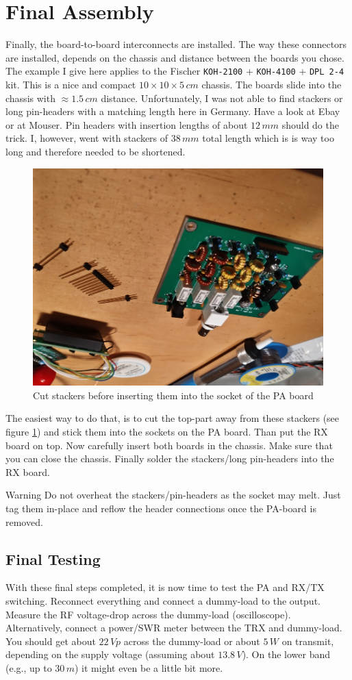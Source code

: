 \documentclass[10pt, a4paper,twoside]{scrartcl}
\newenvironment{warning}{\begin{bclogo}[couleur=red!30,arrondi=.1,logo=\bcattention,ombre=true]{Warning}}{\end{bclogo}}
\begin{document}
\cleardoublepage
\section{Final Assembly} \label{sec:box}
Finally, the board-to-board interconnects are installed. The way these connectors are installed, depends on the chassis and distance between the boards you chose. The example I give here applies to the Fischer \texttt{KOH-2100} + \texttt{KOH-4100} + \texttt{DPL 2-4} kit. This is a nice and compact $10 \times 10 \times 5\,cm$ chassis. The boards slide into the chassis with $\approx 1.5\,cm$ distance. Unfortunately, I was not able to find stackers or long pin-headers with a matching length here in Germany. Have a look at Ebay or at Mouser. Pin headers with insertion lengths of about $12\,mm$ should do the trick. I, however, went with stackers of $38\,mm$ total length which is is way too long and therefore needed to be shortened.

\begin{figure}[!ht]
 \centering
 \includegraphics[width=0.3\linewidth]{fig/stackers_small.png}
 \caption{Cut stackers before inserting them into the socket of the PA board} \label{fig:stackers}
\end{figure}

The easiest way to do that, is to cut the top-part away from these stackers (see figure \ref{fig:stackers}) and stick them into the sockets on the PA board. Than put the RX board on top. Now carefully insert both boards in the chassis. Make sure that you can close the chassis. Finally solder the stackers/long pin-headers into the RX board. 

\begin{warning}
Do not overheat the stackers/pin-headers as the socket may melt. Just tag them in-place and reflow the header connections once the PA-board is removed.
\end{warning}


\subsection{Final Testing}
With these final steps completed, it is now time to test the PA and RX/TX switching. Reconnect everything and connect a dummy-load to the output. Measure the RF voltage-drop across the dummy-load (oscilloscope). Alternatively, connect a power/SWR meter between the TRX and dummy-load. You should get about $22\,Vp$ across the dummy-load or about $5\,W$ on transmit, depending on the supply voltage (assuming about $13.8\,V$). On the lower band (e.g., up to $30\,m$) it might even be a little bit more. 
\end{document}
